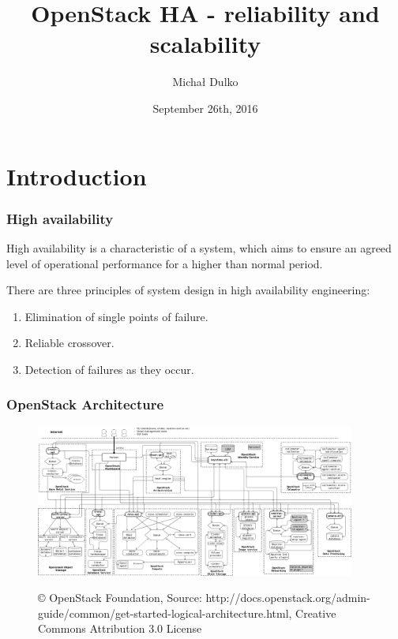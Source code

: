 \documentclass[aspectratio=43]{beamer}
\title{OpenStack HA - reliability and scalability}
\author{Michał Dulko}
\institute{Intel Technology Poland}
\date{September 26th, 2016}
\begin{document}

\begin{frame}
\titlepage
\end{frame}

\section{Introduction}

\begin{frame}
    \frametitle{High availability}
    High availability is a characteristic of a system, which aims to ensure an agreed level of operational performance for a higher than normal period.

    There are three principles of system design in high availability engineering:
    \begin{enumerate}
        \item Elimination of single points of failure.
        \item Reliable crossover.
        \item Detection of failures as they occur.
    \end{enumerate}
\end{frame}

\begin{frame}
    \frametitle{OpenStack Architecture}
    \begin{center}
        \begin{figure}
            \includegraphics[height=5cm]{images/openstack-arch-kilo-logical-v1.png}

            \tiny{© OpenStack Foundation, Source: http://docs.openstack.org/admin-guide/common/get-started-logical-architecture.html,  Creative Commons Attribution 3.0 License}
        \end{figure}
    \end{center}
\end{frame}
\end{document}
